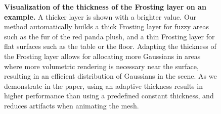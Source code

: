 \begin{figure}[h]
  \caption{
  \textbf{Visualization of the thickness of the Frosting layer on an example.} A thicker layer is shown with a brighter value. Our method automatically builds a thick Frosting layer for fuzzy areas  such as the fur of the red panda plush, and a thin Frosting layer for flat surfaces such as the table or the floor. Adapting the thickness of the Frosting layer allows for allocating more Gaussians in areas where more volumetric rendering is necessary near the surface, resulting in an efficient distribution of Gaussians in the scene. As we demonstrate in the paper, using an adaptive thickness results in higher performance than using a predefined constant thickness, and reduces artifacts when animating the mesh.}
  \label{fig:teaser}
\end{figure}